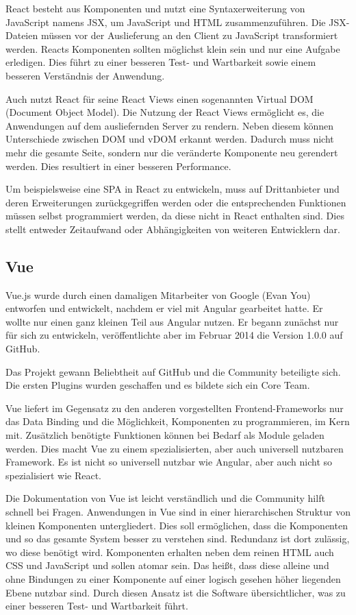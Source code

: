 React besteht aus Komponenten und nutzt eine Syntaxerweiterung von JavaScript namens JSX, um JavaScript und HTML zusammenzuführen. Die JSX-Dateien müssen vor der Auslieferung  an den Client zu JavaScript transformiert werden. Reacts Komponenten sollten möglichst klein sein und nur eine Aufgabe erledigen. Dies führt zu einer besseren Test- und Wartbarkeit sowie einem besseren Verständnis der Anwendung. \cite{bezJavaScriptEinfuehrungReact2015}

Auch nutzt React für seine React Views einen sogenannten Virtual DOM (Document Object Model). Die Nutzung der React Views ermöglicht es, die Anwendungen auf dem ausliefernden Server zu rendern. Neben diesem können Unterschiede zwischen DOM und vDOM erkannt werden. Dadurch muss nicht mehr die gesamte Seite, sondern nur die veränderte Komponente neu gerendert werden. Dies resultiert in einer besseren Performance. \cite{bezJavaScriptEinfuehrungReact2015}

Um beispielsweise eine SPA in React zu entwickeln, muss auf Drittanbieter und deren Erweiterungen zurückgegriffen werden oder die entsprechenden Funktionen müssen selbst programmiert werden, da diese nicht in React enthalten sind. Dies stellt entweder Zeitaufwand oder Abhängigkeiten von weiteren Entwicklern dar.

\subsection{Vue}
Vue.js wurde durch einen damaligen Mitarbeiter von Google (Evan You) entworfen und entwickelt, nachdem er viel mit Angular gearbeitet hatte. Er wollte nur einen ganz kleinen Teil aus Angular nutzen. Er begann zunächst nur für sich zu entwickeln, veröffentlichte aber im Februar 2014 die Version 1.0.0 auf GitHub. \cite{teufelVueJsTutorial2018}

Das Projekt gewann Beliebtheit auf GitHub und die Community beteiligte sich. Die ersten Plugins wurden geschaffen und es bildete sich ein Core Team.

Vue liefert im Gegensatz zu den anderen vorgestellten Frontend-Frameworks nur das Data Binding und die Möglichkeit, Komponenten zu programmieren, im Kern mit. Zusätzlich benötigte Funktionen können bei Bedarf als Module geladen werden. Dies macht Vue zu einem spezialisierten, aber auch universell nutzbaren Framework. Es ist nicht so universell nutzbar wie Angular, aber auch nicht so spezialisiert wie React. \cite{teufelVueJsTutorial2018}

Die Dokumentation von Vue ist leicht verständlich und die Community hilft schnell bei Fragen. Anwendungen in Vue sind in einer hierarchischen Struktur von kleinen Komponenten untergliedert. Dies soll ermöglichen, dass die Komponenten und so das gesamte System besser zu verstehen sind. Redundanz ist dort zulässig, wo diese benötigt wird.
Komponenten erhalten neben dem reinen HTML auch CSS und JavaScript und sollen atomar sein. Das heißt, dass diese alleine und ohne Bindungen zu einer Komponente auf einer logisch gesehen höher liegenden Ebene nutzbar sind. Durch diesen Ansatz ist die Software übersichtlicher, was zu einer besseren Test- und Wartbarkeit führt. \cite{teufelVueJsTutorial2018a}


